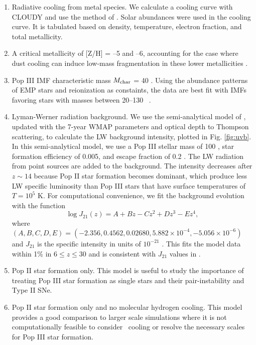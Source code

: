 \documentclass[useAMS,usenatbib]{mn2e}
\begin{document}
\begin{enumerate}
\item Radiative cooling from metal species.  We calculate a cooling
  curve with CLOUDY \citep{CLOUDY} and use the method of
  \citep{2008MNRAS.385.1443S}.  Solar abundances were used in the
  cooling curve.  It is tabulated based on density, temperature,
  electron fraction, and total metallicity.
\item A critical metallicity of [Z/H] = --5 and --6, accounting for
  the case where dust cooling can induce low-mass fragmentation in
  these lower metallicities \citep{Omukai05, Schneider06_Frag}.
\item Pop III IMF characteristic mass $M_{\rm char}$ = 40 \Ms.  Using
  the abundance patterns of EMP stars and reionization as constaints,
  the data are best fit with IMFs favoring stars with masses between
  20--130 \Ms~\citep{Umeda03, Tumlinson06}.
\item Lyman-Werner radiation background.  We use the semi-analytical
  model of \citet{Wise05}, updated with the 7-year WMAP parameters and
  optical depth to Thompson scattering, to calculate the LW background
  intensity, plotted in Fig. \ref{fig:uvb}.  In this semi-analytical
  model, we use a Pop III stellar mass of 100 \Ms, star formation
  efficiency of 0.005, and escape fraction of 0.2 \citep{Wise09}.  The
  LW radiation from point sources are added to the background.  The
  intensity decreases after $z \sim 14$ because Pop II star formation
  becomes dominant, which produce less LW specific luminosity than Pop
  III stars that have surface temperatures of $T = 10^5$ K.  For
  computational convenience, we fit the background evolution with the
  function
%
  \begin{equation}
    \label{eqn:uvb}
    \log J_{21}(z) = A + Bz - Cz^2 + Dz^3 - Ez^4,
  \end{equation}
%
  where $(A,B,C,D,E) = (-2.356, 0.4562, 0.02680, 5.882 \times 10^{-4},
  -5.056 \times 10^{-6})$ and $J_{21}$ is the specific intensity in
  units of $10^{-21}$ \emis.  This fits the
  model data within 1\% in $6 \le z \le 30$ and is consistent with
  $J_{21}$ values in \citet{Trenti09_SFR}.
\item Pop II star formation only.  This model is useful to study the
  importance of treating Pop III star formation as single stars and
  their pair-instability and Type II SNe.
\item Pop II star formation only and no molecular hydrogen cooling.
  This model provides a good comparison to larger scale simulations
  where it is not computationally feasible to consider \hh~cooling or
  resolve the necessary scales for Pop III star formation.
\end{enumerate}
\end{document}
